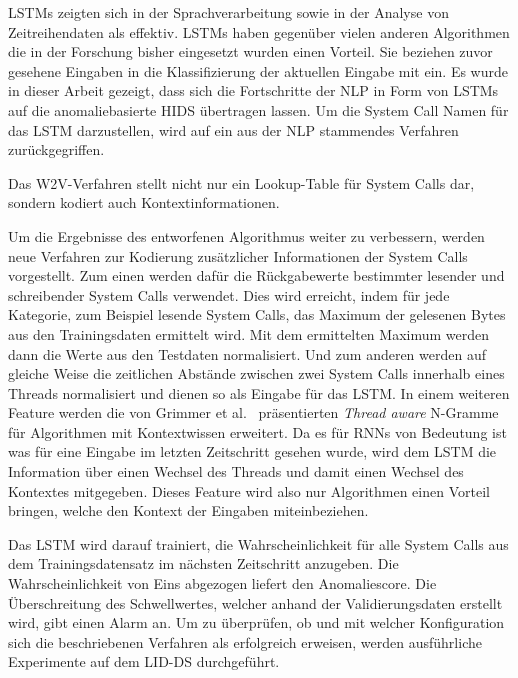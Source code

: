 \acfp{LSTM} zeigten sich in der Sprachverarbeitung sowie in der Analyse von Zeitreihendaten als effektiv.
\acp{LSTM} haben gegenüber vielen anderen Algorithmen die in der Forschung bisher eingesetzt wurden einen Vorteil.
Sie beziehen zuvor gesehene Eingaben in die Klassifizierung der aktuellen Eingabe mit ein.
Es wurde in dieser Arbeit gezeigt, dass sich die Fortschritte der \ac{NLP} in Form von \acp{LSTM} auf die anomaliebasierte \ac{HIDS} übertragen lassen.
Um die System Call Namen für das \ac{LSTM} darzustellen, wird auf ein aus der \ac{NLP} stammendes Verfahren zurückgegriffen.\par\medskip

Das \ac{W2V}-Verfahren stellt nicht nur ein Lookup-Table für System Calls dar, sondern kodiert auch Kontextinformationen.\par\medskip

Um die Ergebnisse des entworfenen Algorithmus weiter zu verbessern, werden neue Verfahren zur Kodierung zusätzlicher Informationen der System Calls vorgestellt.
Zum einen werden dafür die Rückgabewerte bestimmter lesender und schreibender System Calls verwendet. 
Dies wird erreicht, indem für jede Kategorie, zum Beispiel lesende System Calls, das Maximum der gelesenen Bytes aus den Trainingsdaten ermittelt wird.
Mit dem ermittelten Maximum werden dann die Werte aus den Testdaten normalisiert.
Und zum anderen werden auf gleiche Weise die zeitlichen Abstände zwischen zwei System Calls innerhalb eines Threads normalisiert und dienen so als Eingabe für das \ac{LSTM}.
In einem weiteren Feature werden die von Grimmer et al.~\cite{IDSTHREADGRIMMER2021} präsentierten \textit{Thread aware} N-Gramme für Algorithmen mit Kontextwissen erweitert.
Da es für \acp{RNN} von Bedeutung ist was für eine Eingabe im letzten Zeitschritt gesehen wurde, wird dem \ac{LSTM} die Information über einen Wechsel des Threads und damit einen Wechsel des Kontextes mitgegeben.
Dieses Feature wird also nur Algorithmen einen Vorteil bringen, welche den Kontext der Eingaben miteinbeziehen.\par\medskip

Das \ac{LSTM} wird darauf trainiert, die Wahrscheinlichkeit für alle System Calls aus dem Trainingsdatensatz im nächsten Zeitschritt anzugeben.
Die Wahrscheinlichkeit von Eins abgezogen liefert den Anomaliescore.
Die Überschreitung des Schwellwertes, welcher anhand der Validierungsdaten erstellt wird, gibt einen Alarm an.
Um zu überprüfen, ob und mit welcher Konfiguration sich die beschriebenen Verfahren als erfolgreich erweisen, werden ausführliche Experimente auf dem \ac{LID-DS} durchgeführt.\par\medskip

